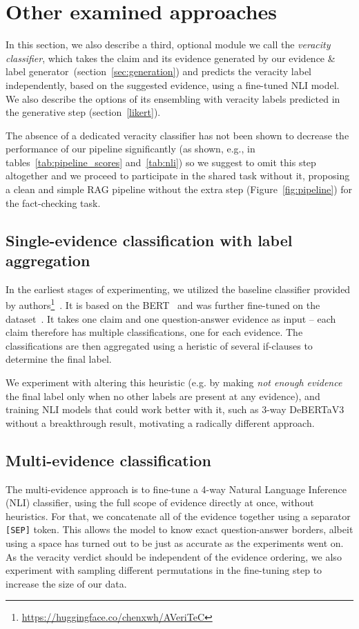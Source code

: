 \section{Other examined approaches}
\label{sec:failed}
In this section, we also describe a third, optional module we call the \textit{veracity classifier}, which takes the claim and its evidence generated by our evidence \& label generator~(section~\ref{sec:generation}) and predicts the veracity label independently, based on the suggested evidence, using a fine-tuned NLI model.
We also describe the options of its ensembling with veracity labels predicted in the generative step (section~\ref{likert}).

The absence of a dedicated veracity classifier has not been shown to decrease the performance of our pipeline significantly (as shown, e.g., in tables~\ref{tab:pipeline_scores} and~\ref{tab:nli}) so we suggest to omit this step altogether and we proceed to participate in the \averitec{}  shared task without it, proposing a clean and simple RAG pipeline without the extra step (Figure~\ref{fig:pipeline}) for the fact-checking task.

\subsection{Single-evidence classification with label aggregation}
In the earliest stages of experimenting, we utilized the baseline classifier provided by \averitec{} authors\footnote{\url{https://huggingface.co/chenxwh/AVeriTeC}}~\cite{averitec2024}.
It is based on the BERT~\cite{devlin-etal-2019-bert} and was further fine-tuned on the \averitec{}  dataset~\cite{averitec2024}. 
It takes one claim and one question-answer evidence as input -- each claim therefore has multiple classifications, one for each evidence. The classifications are then aggregated using a heristic of several if-clauses to determine the final label. 

We experiment with altering this heuristic (e.g. by making \textit{not enough evidence} the final label only when no other labels are present at any evidence), and training NLI models that could work better with it, such as 3-way DeBERTaV3~\cite{he2023debertav3improvingdebertausing} without a breakthrough result, motivating a radically different approach.

\subsection{Multi-evidence classification}
\label{subsubsec:concatenation}
The multi-evidence approach is to fine-tune a 4-way Natural Language Inference (NLI) classifier, using the full scope of evidence directly at once, without heuristics.
For that, we concatenate all of the evidence together using a separator \texttt{[SEP]} token. This allows the model to know exact question-answer borders, albeit using a space has turned out to be just as accurate as the experiments went on. As the veracity verdict should be independent of the evidence ordering, we also experiment with sampling different permutations in the fine-tuning step to increase the size of our data.

